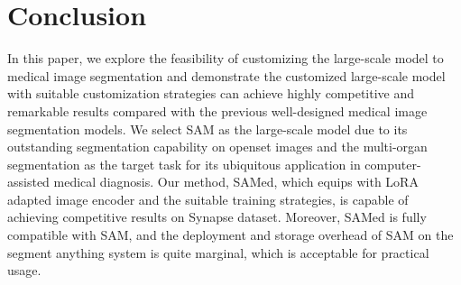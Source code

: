 \documentclass[runningheads]{llncs}
\begin{document}
\section{Conclusion}
In this paper, we explore the feasibility of customizing the large-scale model to medical image segmentation and demonstrate the customized large-scale model with suitable customization strategies can achieve highly competitive and remarkable results compared with the previous well-designed medical image segmentation models. We select SAM as the large-scale model due to its outstanding segmentation capability on openset images and the multi-organ segmentation as the target task for its ubiquitous application in computer-assisted medical diagnosis. Our method, SAMed, which equips with LoRA adapted image encoder and the suitable training strategies, is capable of achieving competitive results on Synapse dataset. Moreover, SAMed is fully compatible with SAM, and the deployment and storage overhead of SAM on the segment anything system is quite marginal, which is acceptable for practical usage.






\end{document}
